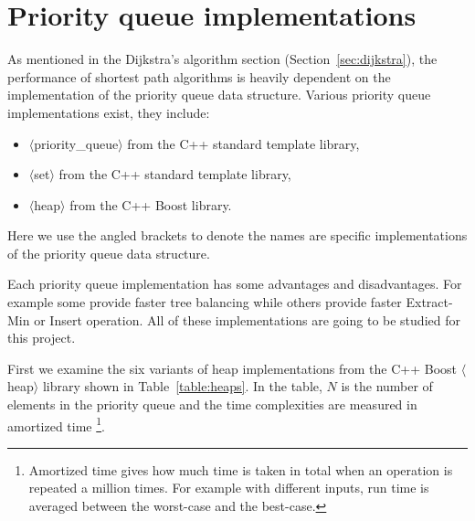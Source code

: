 \section{Priority queue implementations} \label{sec:pq_implementation}
As mentioned in the Dijkstra's algorithm section (Section~\ref{sec:dijkstra}),
the performance of shortest path algorithms is heavily dependent on the implementation of the priority queue data structure.
Various priority queue implementations exist,
they include:
\begin{itemize}
    \item $\langle$priority\_queue$\rangle$ from the C++ standard template library,
    \item $\langle$set$\rangle$ from the C++ standard template library,
    \item $\langle$heap$\rangle$ from the C++ Boost library.
\end{itemize}
Here we use the angled brackets to denote the names are specific implementations of the priority queue data structure.

Each priority queue implementation has some advantages and disadvantages.
For example some provide faster tree balancing while others provide faster Extract-Min or Insert operation.
All of these implementations are going to be studied for this project.

First we examine the six variants of heap implementations from the C++ Boost $\langle$heap$\rangle$ library shown in Table~\ref{table:heaps}.
In the table, $N$ is the number of elements in the priority queue and
the time complexities are measured in amortized time
\footnote{Amortized time gives how much time is taken in total when an operation is repeated a million times. For example with different inputs, run time is averaged between the worst-case and the best-case.}.

